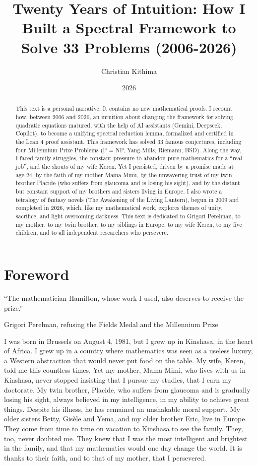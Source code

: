 \documentclass[11pt,a4paper]{article}
\title{Twenty Years of Intuition: How I Built a Spectral Framework to Solve 33 Problems (2006-2026)}
\author{Christian Kithima}
\date{2026}
\begin{document}
\maketitle

\begin{abstract}
This text is a personal narrative. It contains no new mathematical proofs. I recount how, between 2006 and 2026, an intuition about changing the framework for solving quadratic equations matured, with the help of AI assistants (Gemini, Deepseek, Copilot), to become a unifying spectral reduction lemma, formalized and certified in the Lean 4 proof assistant. This framework has solved 33 famous conjectures, including four Millennium Prize Problems (P = NP, Yang-Mills, Riemann, BSD). Along the way, I faced family struggles, the constant pressure to abandon pure mathematics for a ``real job'', and the shouts of my wife Keren. Yet I persisted, driven by a promise made at age 24, by the faith of my mother Mama Mimi, by the unwavering trust of my twin brother Placide (who suffers from glaucoma and is losing his sight), and by the distant but constant support of my brothers and sisters living in Europe. I also wrote a tetralogy of fantasy novels (The Awakening of the Living Lantern), begun in 2009 and completed in 2026, which, like my mathematical work, explores themes of unity, sacrifice, and light overcoming darkness. This text is dedicated to Grigori Perelman, to my mother, to my twin brother, to my siblings in Europe, to my wife Keren, to my five children, and to all independent researchers who persevere.
\end{abstract}

\section*{Foreword}

\epigraph{``The mathematician Hamilton, whose work I used, also deserves to receive the prize.''}{Grigori Perelman, refusing the Fields Medal and the Millennium Prize}

I was born in Brussels on August 4, 1981, but I grew up in Kinshasa, in the heart of Africa. I grew up in a country where mathematics was seen as a useless luxury, a Western abstraction that would never put food on the table. My wife, Keren, told me this countless times. Yet my mother, Mama Mimi, who lives with us in Kinshasa, never stopped insisting that I pursue my studies, that I earn my doctorate. My twin brother, Placide, who suffers from glaucoma and is gradually losing his sight, always believed in my intelligence, in my ability to achieve great things. Despite his illness, he has remained an unshakable moral support. My older sisters Betty, Gisèle and Yema, and my older brother Eric, live in Europe. They come from time to time on vacation to Kinshasa to see the family. They, too, never doubted me. They knew that I was the most intelligent and brightest in the family, and that my mathematics would one day change the world. It is thanks to their faith, and to that of my mother, that I persevered.
\end{document}
